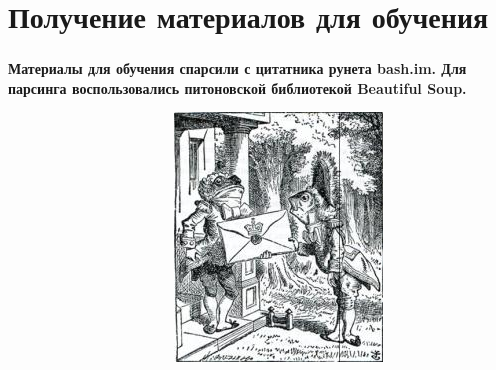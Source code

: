 \documentclass[t]{beamer}
\begin{document}
	
	\section{Получение материалов для обучения}
	\begin{frame}
		\frametitle{\insertsection}
		\textbf{Материалы для обучения спарсили с цитатника рунета bash.im. Для парсинга воспользовались питоновской библиотекой Beautiful Soup. \newline}
		
		~~~~~~~~~~~~~~~~~~~~~~~ {\includegraphics[scale = 0.6]{images/beautiful_soup.jpg}}
	\end{frame}
	
	
\end{document}
